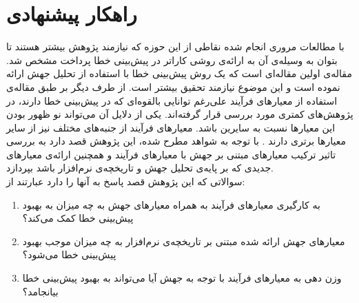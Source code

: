 \section{راهکار پیشنهادی}
\label{sec:method}
با  مطالعات مروری انجام شده نقاطی از این حوزه که نیازمند پژوهش بیشتر هستند تا بتوان به وسیله‌ی آن به ارائه‌ی روشی کاراتر در پیش‌بینی خطا پرداخت مشخص شد. مقاله‌ی \cite{bowes2016mutation} اولین مقاله‌ای است که  یک  روش پیش‌بینی خطا با استفاده از تحلیل جهش ارائه نموده  است و این موضوع نیازمند تحقیق بیشتر است. از طرف دیگر بر طبق مقاله‌ی \cite{radjenovic2013software} استفاده از معیارهای فرآیند علی‌رغم توانایی بالقوه‌ای که در پیش‌بینی خطا دارند، در پژوهش‌های کمتری مورد بررسی قرار گرفته‌اند. یکی از دلایل آن می‌تواند نو ظهور بودن این معیارها نسبت به سایرین باشد. معیارهای فرآیند از جنبه‌های مختلف نیز از سایر معیار‌ها برتری دارند \cite{rahman2013and}. با توجه به شواهد مطرح شده، این پژوهش قصد دارد به بررسی تاثیر ترکیب معیارهای مبتنی بر جهش با معیارهای فرآیند و همچنین ارائه‌ی معیارهای جدیدی که بر پایه‌ی تحلیل جهش و تاریخچه‌ی نرم‌افزار باشد بپردازد.\\
سوالاتی که این پژوهش قصد پاسخ به آنها را دارد عبارتند از:

\begin{enumerate}
	\item  
	به کارگیری معیارهای فرآیند به همراه معیارهای جهش به چه میزان به بهبود پیش‌بینی خطا کمک می‌کند؟
	\item 
	معیارهای جهش ارائه شده مبتنی بر تاریخچه‌ی نرم‌افزار به چه میزان موجب بهبود پیش‌بینی خطا می‌شود؟
	\item 
	وزن دهی به معیارهای فرآیند با توجه به جهش آیا می‌تواند به بهبود پیش‌بینی خطا بیانجامد؟  
\end{enumerate}

